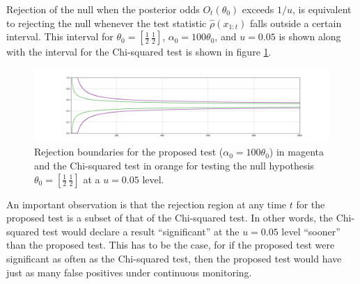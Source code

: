 \documentclass[11pt]{article}
\begin{document}
  Rejection of the null when the posterior odds $O_t(\theta_0)$ exceeds $1/u$, is equivalent to rejecting the null whenever the test statistic $\hat{\rho}(x_{1:t})$ falls outside a certain interval.
This interval for $\theta_0 = [\frac{1}{2}\, \frac{1}{2}]$, $\alpha_0 = 100\theta_0 $, and $u=0.05$ is shown along with the interval for the Chi-squared test is shown in figure \ref{fig:critical}.
\begin{figure}[H]
  \centering
  \includegraphics[scale=0.35]{images/critical_regions.png}
  \caption{Rejection boundaries for the proposed test ($\alpha_0 = 100\theta_0$) in magenta and the Chi-squared test in orange for testing the null hypothesis $\theta_0 = [\frac{1}{2} \, \frac{1}{2}]$ at a $u=0.05$ level.
}
    \label{fig:critical}
  \end{figure}
  An important observation is that the rejection region at any time $t$ for the proposed test is a subset of that of the Chi-squared test.
In other words, the Chi-squared test would declare a result ``significant'' at the $u=0.05$ level ``sooner'' than the proposed test.
This has to be the case, for if the proposed test were significant as often as the Chi-squared test, then the proposed test would have just as many false positives under continuous monitoring.
  
\end{document}
